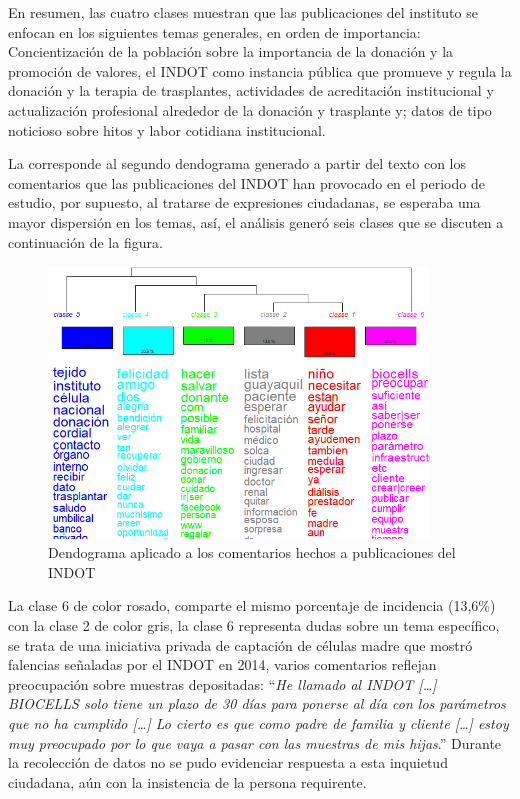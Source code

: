 \documentclass[spanish]{textolivre}
\begin{document}
En resumen, las cuatro clases muestran que las publicaciones del instituto se enfocan en los siguientes temas generales, en orden de importancia: Concientización de la población sobre la importancia de la donación y la promoción de valores, el INDOT como instancia pública que promueve y regula la donación y la terapia de trasplantes, actividades de acreditación institucional y actualización profesional alrededor de la donación y trasplante y; datos de tipo noticioso sobre hitos y labor cotidiana institucional.

La  corresponde al segundo dendograma generado a partir del texto con los comentarios que las publicaciones del INDOT han provocado en el periodo de estudio, por supuesto, al tratarse de expresiones ciudadanas, se esperaba una mayor dispersión en los temas, así, el análisis generó seis clases que se discuten a continuación de la figura.

\begin{figure}[htbp]
 \centering
 \includegraphics[width=0.9\textwidth]{figure02.png}
 \caption{Dendograma aplicado a los comentarios hechos a publicaciones del INDOT}
 \label{fig2}
\end{figure}
 
La clase 6 de color rosado, comparte el mismo porcentaje de incidencia (13,6\%) con la clase 2 de color gris, la clase 6 representa dudas sobre un tema específico, se trata de una iniciativa privada de captación de células madre que mostró falencias señaladas por el INDOT en 2014, varios comentarios reflejan preocupación sobre muestras depositadas: “\emph{He llamado al INDOT […] BIOCELLS solo tiene un plazo de 30 días para ponerse al día con los parámetros que no ha cumplido […] Lo cierto es que como padre de familia y cliente […] estoy muy preocupado por lo que vaya a pasar con las muestras de mis hijas}.” Durante la recolección de datos no se pudo evidenciar respuesta a esta inquietud ciudadana, aún con la insistencia de la persona requirente. 
\end{document}
